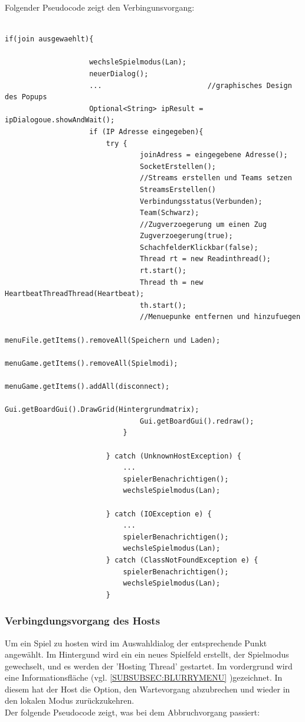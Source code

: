 \documentclass[12pt,a4paper]{article}
\begin{document}
{Folgender Pseudocode zeigt den Verbingunsvorgang: \\
\lstset{language=Java}
\begin{lstlisting}

if(join ausgewaehlt){				

					wechsleSpielmodus(Lan);				
					neuerDialog();
					...							//graphisches Design des Popups
					Optional<String> ipResult = ipDialogoue.showAndWait();
					if (IP Adresse eingegeben){										
						try {
								joinAdress = eingegebene Adresse();
								SocketErstellen();
								//Streams erstellen und Teams setzen	
								StreamsErstellen()
								Verbindungsstatus(Verbunden);
								Team(Schwarz);			
								//Zugverzoegerung um einen Zug		
								Zugverzoegerung(true);
								SchachfelderKlickbar(false);
								Thread rt = new Readinthread();  		
								rt.start();
								Thread th = new HeartbeatThreadThread(Heartbeat);
								th.start();
								//Menuepunke entfernen und hinzufuegen
								menuFile.getItems().removeAll(Speichern und Laden);
								menuGame.getItems().removeAll(Spielmodi);		
								menuGame.getItems().addAll(disconnect);	
								Gui.getBoardGui().DrawGrid(Hintergrundmatrix);		
								Gui.getBoardGui().redraw();
							}

						} catch (UnknownHostException) {
							...
							spielerBenachrichtigen();
							wechsleSpielmodus(Lan);		
							
						} catch (IOException e) {
							...
							spielerBenachrichtigen();
							wechsleSpielmodus(Lan);		
						} catch (ClassNotFoundException e) {
							spielerBenachrichtigen();
							wechsleSpielmodus(Lan);		
						}
\end{lstlisting}

\subsubsection{Verbingdungsvorgang des Hosts}
\label{SUBSUBSEC:CONHOST}

Um ein Spiel zu hosten wird im Auswahldialog der entsprechende Punkt angewählt. 
Im Hintergund wird ein ein neues Spielfeld erstellt, der Spielmodus gewechselt, und es werden der 'Hosting Thread' gestartet.
Im vordergrund wird eine Informationsfläche (vgl. \ref{SUBSUBSEC:BLURRYMENU} )gezeichnet. In diesem hat der Host die Option, den Wartevorgang abzubrechen und wieder in den lokalen Modus zurückzukehren. \\
Der folgende Pseudocode zeigt, was bei dem Abbruchvorgang passiert: 
\lstset{language=java}
\begin{lstlisting}


\end{lstlisting}}
\end{document}

